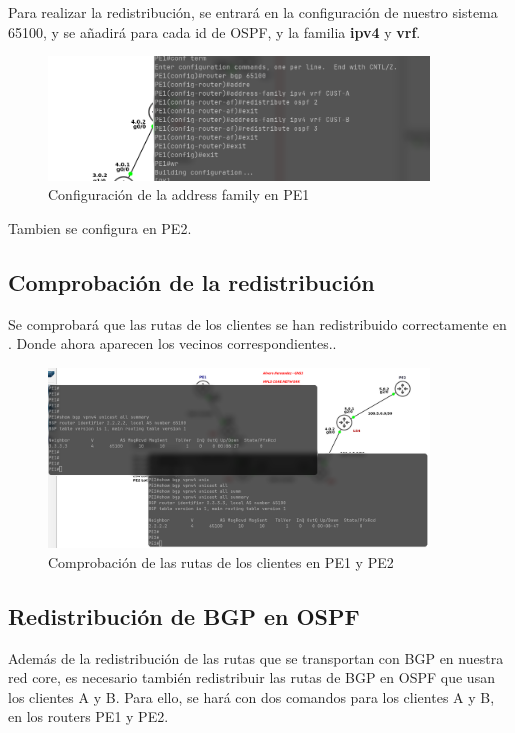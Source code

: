 \documentclass{article}
\begin{document}
Para realizar la redistribución, se entrará en la configuración de nuestro sistema 65100, y se añadirá para cada id de OSPF, y la familia \textbf{ipv4} y \textbf{vrf}.

\begin{figure}[h]
    \centering
    \includegraphics[width=0.9\textwidth]{src/addressfamily.png}
    \caption{Configuración de la address family en PE1}
\end{figure}

Tambien se configura en PE2.

\subsection{Comprobación de la redistribución}

Se comprobará que las rutas de los clientes se han redistribuido correctamente en . Donde ahora aparecen los vecinos correspondientes..

\begin{figure}[h]
    \centering
    \includegraphics[width=0.9\textwidth]{src/vecinos.png}
    \caption{Comprobación de las rutas de los clientes en PE1 y PE2}
\end{figure}
\newpage

\subsection{Redistribución de BGP en OSPF}

Además de la redistribución de las rutas que se transportan con BGP en nuestra red core, es necesario también redistribuir las rutas de BGP en OSPF que usan los clientes A y B. Para ello, se hará con dos comandos para los clientes A y B, en los routers PE1 y PE2.
\end{document}
